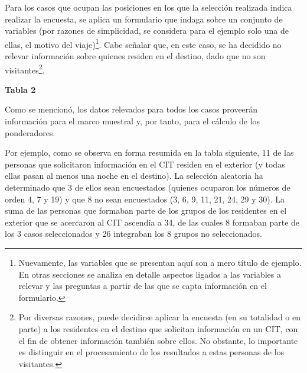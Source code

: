 \documentclass[
]{book}
\begin{document}
Para los casos que ocupan las posiciones en los que la selección realizada indica realizar la encuesta, se aplica un formulario que indaga sobre un conjunto de variables (por razones de simplicidad, se considera para el ejemplo solo una de ellas, el motivo del viaje)\footnote{Nuevamente, las variables que se presentan aquí son a mero título de ejemplo. En otras secciones se analiza en detalle aspectos ligados a las variables a relevar y las preguntas a partir de las que se capta información en el formulario.}. Cabe señalar que, en este caso, se ha decidido no relevar información sobre quienes residen en el destino, dado que no son visitantes\footnote{Por diversas razones, puede decidirse aplicar la encuesta (en su totalidad o en parte) a los residentes en el destino que solicitan información en un CIT, con el fin de obtener información también sobre ellos. No obstante, lo importante es distinguir en el procesamiento de los resultados a estas personas de los visitantes.}.

\textbf{Tabla 2}

Como se mencionó, los datos relevados para todos los casos proveerán información para el marco muestral y, por tanto, para el cálculo de los ponderadores.

Por ejemplo, como se observa en forma resumida en la tabla siguiente, 11 de las personas que solicitaron información en el CIT residen en el exterior (y todas ellas pasan al menos una noche en el destino). La selección aleatoria ha determinado que 3 de ellos sean encuestados (quienes ocuparon los números de orden 4, 7 y 19) y que 8 no sean encuestados (3, 6, 9, 11, 21, 24, 29 y 30). La suma de las personas que formaban parte de los grupos de los residentes en el exterior que se acercaron al CIT ascendía a 34, de las cuales 8 formaban parte de los 3 casos seleccionados y 26 integraban los 8 grupos no seleccionados.
\end{document}
